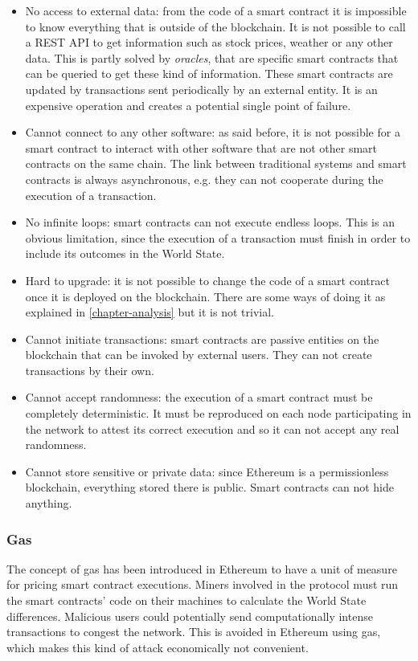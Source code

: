 \begin{itemize}
    \item No access to external data: from the code of a smart contract it is impossible to know everything that is outside of the blockchain. It is not possible to call a REST API to get information such as stock prices, weather or any other data. This is partly solved by \textit{oracles}, that are specific smart contracts that can be queried to get these kind of information. These smart contracts are updated by transactions sent periodically by an external entity. It is an expensive operation and creates a potential single point of failure.
    \item Cannot connect to any other software: as said before, it is not possible for a smart contract to interact with other software that are not other smart contracts on the same chain. The link between traditional systems and smart contracts is always asynchronous, e.g. they can not cooperate during the execution of a transaction.
    \item No infinite loops: smart contracts can not execute endless loops. This is an obvious limitation, since the execution of a transaction must finish in order to include its outcomes in the World State.
    \item Hard to upgrade: it is not possible to change the code of a smart contract once it is deployed on the blockchain. There are some ways of doing it as explained in \cref{chapter-analysis} but it is not trivial. 
    \item Cannot initiate transactions: smart contracts are passive entities on the blockchain that can be invoked by external users. They can not create transactions by their own.
    \item Cannot accept randomness: the execution of a smart contract must be completely deterministic. It must be reproduced on each node participating in the network to attest its correct execution and so it can not accept any real randomness.
    \item  Cannot store sensitive or private data: since Ethereum is a permissionless blockchain, everything stored there is public. Smart contracts can not hide anything. 
\end{itemize}

\subsubsection{Gas}

The concept of gas has been introduced in Ethereum to have a unit of measure for pricing smart contract executions. Miners involved in the protocol must run the smart contracts' code on their machines to calculate the World State differences. Malicious users could potentially send computationally intense transactions to congest the network. This is avoided in Ethereum using gas, which makes this kind of attack economically not convenient.


